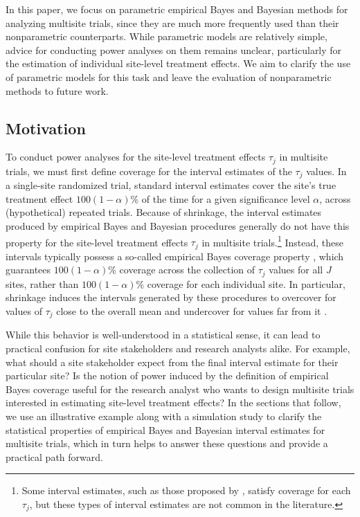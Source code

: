 \documentclass[]{article}
\begin{document}
In this paper, we focus on parametric empirical Bayes and Bayesian methods for analyzing multisite trials, since they are much more frequently used than their nonparametric counterparts.
While parametric models are relatively simple, advice for conducting power analyses on them remains unclear, particularly for the estimation of individual site-level treatment effects.
We aim to clarify the use of parametric models for this task and leave the evaluation of nonparametric methods to future work.

\subsection{Motivation}

To conduct power analyses for the site-level treatment effects $\tau_j$ in multisite trials, we must first define coverage for the interval estimates of the $\tau_j$ values.
In a single-site randomized trial, standard interval estimates cover the site's true treatment effect $100(1-\alpha)$\% of the time for a given significance level $\alpha$, across (hypothetical) repeated trials.
Because of shrinkage, the interval estimates produced by empirical Bayes and Bayesian procedures generally do not have this property for the site-level treatment effects $\tau_j$ in multisite trials.\footnote{Some interval estimates, such as those proposed by \citet{yu2018adaptive}, satisfy coverage for each $\tau_j$, but these types of interval estimates are not common in the literature.}
Instead, these intervals typically possess a so-called empirical Bayes coverage property \citep{morris1983parametric}, which guarantees $100(1-\alpha)$\% coverage across the collection of $\tau_j$ values for all $J$ sites, rather than $100(1-\alpha)$\% coverage for each individual site.
In particular, shrinkage induces the intervals generated by these procedures to overcover for values of $\tau_j$ close to the overall mean and undercover for values far from it \citep{snijders2011multilevel}.

While this behavior is well-understood in a statistical sense, it can lead to practical confusion for site stakeholders and research analysts alike.
For example, what should a site stakeholder expect from the final interval estimate for their particular site?
Is the notion of power induced by the definition of empirical Bayes coverage useful for the research analyst who wants to design multisite trials interested in estimating site-level treatment effects?
In the sections that follow, we use an illustrative example along with a simulation study to clarify the statistical properties of empirical Bayes and Bayesian interval estimates for multisite trials, which in turn helps to answer these questions and provide a practical path forward.
\end{document}
